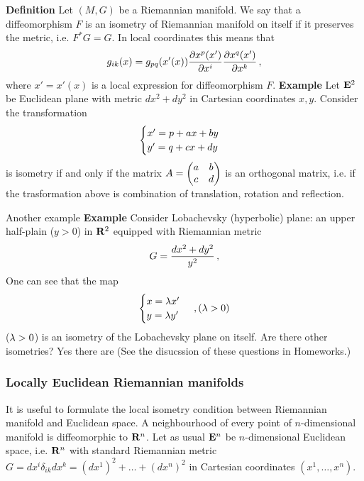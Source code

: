 \documentclass[12pt]{article}
\theoremstyle{theorem}
\numberwithin{equation}{section}
\begin{document}
{\bf Definition} Let $(M,G)$ be a Riemannian manifold. We say that
a diffeomorphism $F$ is an isometry of Riemannian manifold
on itself if it preserves the metric, i.e. $F^*G=G$.
In local coordinates this means that
              \begin{equation}\label{isometry1}
        g_{ik}(x)=g_{pq}(x'(x)){\partial x^p(x')\over \partial x^i}
                       {\partial x^q(x')\over \partial x^k}\,,
               \end{equation}
where $x'=x'(x)$ is a local expression for diffeomorphism $F$.
{\bf Example}  Let ${\bf E}^2$ be Euclidean plane with metric $dx^2+dy^2$
in Cartesian coordinates $x,y$. Consider the transformation
       \begin{equation*}
   \begin{cases}
      x'=p+ax+by\cr
     y'=q+cx+dy\cr
    \end{cases}
          \end{equation*}
is isometry if and only if the matrix 
$A=\begin{pmatrix}a &b\cr c &d\cr\end{pmatrix}$
is an orthogonal matrix, i.e. if the trasformation above
is combination of translation, rotation and reflection.

\medskip

Another example
  {\bf Example} Consider Lobachevsky (hyperbolic) plane:
     an upper half-plain ($y>0$) 
in ${\bf R}^2$ equipped with 
Riemannian metric
            $$
     G={dx^2+dy^2\over y^2}\,,
            $$
One can see that  the map 
$$
\begin{cases} 
x=\lambda x'\cr y=\lambda y'\cr
 \end{cases}\,, (\lambda>0)
     $$
($\lambda>0$)  is an isometry of the Lobachevsky plane on itself.
Are there other isometries? Yes  there are 
(See the disucssion of these questions in Homeworks.) 



\subsubsection {Locally Euclidean Riemannian 
 manifolds }
It is useful to formulate the  local isometry condition between
Riemannian manifold and Euclidean space.
A neighbourhood of every point of $n$-dimensional
 manifold is diffeomorphic to ${\bf R}^n$.
Let as usual ${\bf E}^n$ be $n$-dimensional
Euclidean space, i.e. ${\bf R}^n$  with standard Riemannian metric
$G=dx^i\delta_{ik}dx^k=(dx^1)^2+\dots+(dx^n)^2$
in Cartesian coordinates $(x^1,\dots,x^n)$.
\end{document}
